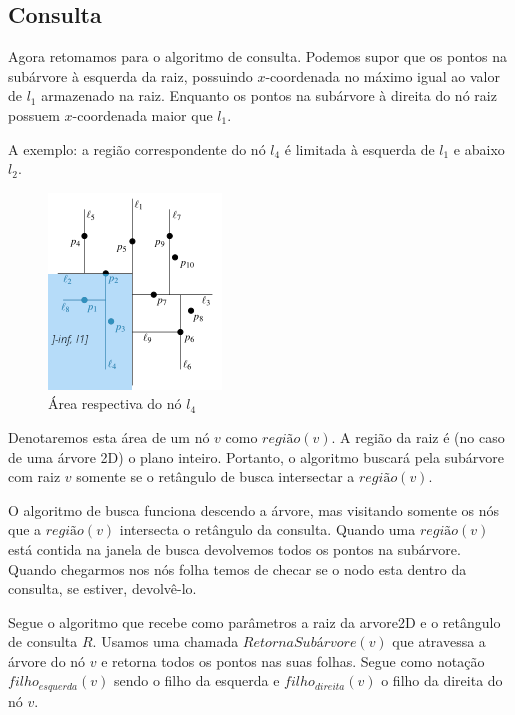 \subsection{Consulta}

Agora retomamos para o algoritmo de consulta. Podemos supor que os pontos na subárvore à esquerda
da raiz, possuindo $x$-coordenada no máximo igual ao valor de $l_1$ armazenado na raiz.
Enquanto os pontos na subárvore à direita do nó raiz possuem $x$-coordenada maior que $l_1$.

A exemplo: a região correspondente do nó \(l_4\) é limitada à esquerda de
\(l_1\) e abaixo \(l_2\).


\begin{figure}[htb]
    \caption{\label{fig:Fig_4} Área respectiva do nó $l_4$}
    \begin{center}
        \includegraphics{images/kd_tree2.png}
    \end{center}
\end{figure}

Denotaremos esta área de um nó \(v\) como \(região(v)\). A região da raiz é (no caso de uma árvore 2D) 
o plano inteiro.
Portanto, o algoritmo buscará pela subárvore com raiz \(v\) somente se o retângulo de busca intersectar
a \(região(v)\).

O algoritmo de busca funciona descendo a árvore, mas visitando somente os nós que a
\(região(v)\) intersecta o retângulo da consulta. Quando uma \(região(v)\) está contida na
janela de busca devolvemos todos os pontos na subárvore.
Quando chegarmos nos nós folha temos de checar se o nodo esta dentro da consulta, se estiver,
devolvê-lo.

Segue o algoritmo que recebe como parâmetros a raiz da arvore2D e o retângulo de consulta \(R\).
Usamos uma chamada \(RetornaSubárvore(v)\) que atravessa a árvore do nó \(v\) e retorna
todos os pontos nas suas folhas. Segue como notação \(filho_{esquerda}(v)\) sendo o filho da esquerda e
\(filho_{direita}(v)\) o filho da direita do nó \(v\).


